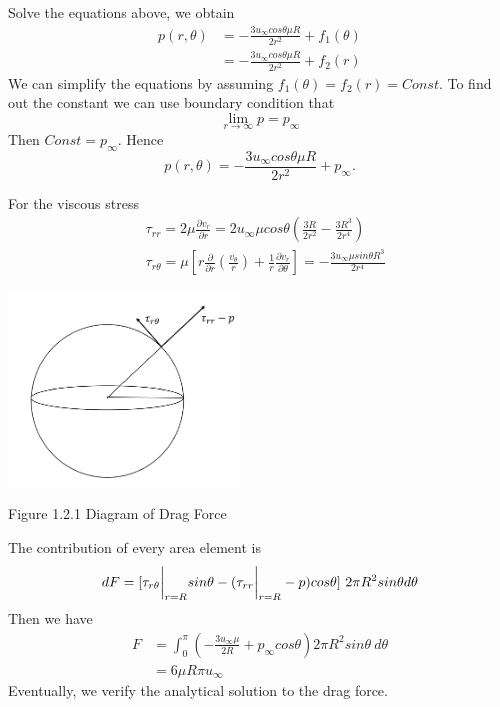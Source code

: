 \documentclass{report}
\begin{document}
Solve the equations above, we obtain
\begin{equation}
\begin{aligned}
    p(r,\theta) &= -\frac{3u_{\infty}cos\theta \mu R }{2r^2} + f_1(\theta) \\
    & = -\frac{3u_{\infty}cos\theta \mu R}{2r^2} + f_2(r) 
\end{aligned}    
\end{equation}
We can simplify the equations by assuming $f_1(\theta) = f_2(r) = Const$. To find out the constant we can use boundary condition that
\begin{equation}
    \lim_{r \rightarrow \infty}p = p_{\infty}
\end{equation}
Then $Const = p_{\infty}$. Hence
\begin{equation}
    p(r,\theta) = -\frac{3u_{\infty}cos\theta \mu R }{2r^2} + p_{\infty}.
\end{equation}

\indent For the viscous stress
\begin{equation}
\begin{aligned}
    &\tau_{rr} = 2\mu \frac{\partial v_r}{\partial r} = 2u_{\infty} \mu cos\theta (\frac{3R}{2r^2} -\frac{3R^3}{2r^4}) \\
    &\tau_{r\theta} = \mu[r\frac{\partial}{\partial r}(\frac{v_{\theta}}{r}) + \frac{1}{r} \frac{\partial v_{r}}{\partial \theta}] = -\frac{3 u_{\infty} \mu sin\theta R^3}{2r^4}
\end{aligned}
\end{equation} 
\indent
\graphicspath{ {./ENGG1350 Experiment Data/} }
\centerline{\includegraphics[height = 5.12cm]{Auxiliary Files/ENGG1350 Experiment Data/1350 image.png}}
\centerline{Figure 1.2.1 Diagram of Drag Force}

\clearpage

\noindent The contribution of every area element is
\begin{equation}
    dF = [\tau_{r\theta} \bigg|_{r = R} sin\theta - (\tau_{rr} \bigg|_{r = R} - p)cos\theta]~2\pi R^2sin\theta d\theta \notag
\end{equation}
Then we have
\begin{equation}
\begin{aligned}
    F &= \int^{\pi}_{0} (-\frac{3 u_{\infty} \mu }{2R} + p_{\infty}cos\theta )2\pi R^2 sin\theta ~d\theta \\
    & = 6\mu R \pi u_{\infty} 
\end{aligned}
\end{equation}
Eventually, we verify the analytical solution to the drag force.
\end{document}
